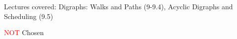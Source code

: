 \documentclass[handout]{mcs}
\begin{document}
\renewcommand{\reading}{Chapter~\bref{digraphs_chap}.\ \emph{Directed
    Graphs} through Section~\bref{dag_sec}.\ \emph{Directed
    Acyclic Graphs}.}


\begin{staffnotes}
Lectures covered: Digraphs: Walks and Paths (9-9.4), Acyclic Digraphs
and Scheduling (9.5)

\end{staffnotes}




\textcolor{red}{NOT} Chosen







\end{document}
